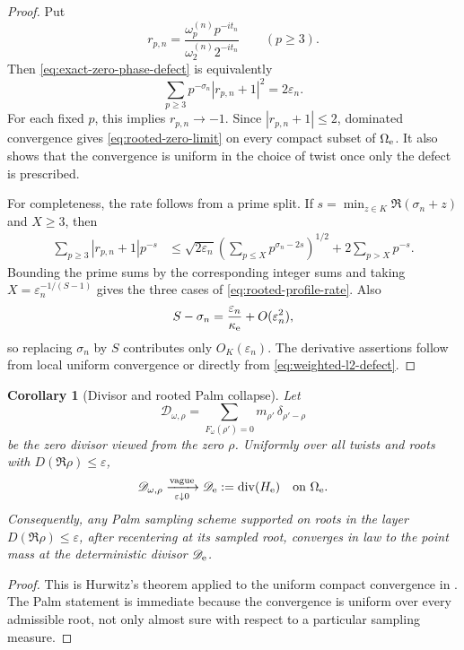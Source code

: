 \documentclass[11pt]{article}
\newtheorem{corollary}[theorem]{Corollary}
\theoremstyle{definition}
\theoremstyle{remark}
\newcommand{\eps}{\varepsilon}
\begin{document}
\begin{proof}
Put
\[
 r_{p,n}=\frac{\omega^{(n)}_p p^{-it_n}}
                 {\omega^{(n)}_2 2^{-it_n}}
 \qquad(p\ge3).
\]
Then \eqref{eq:exact-zero-phase-defect} is equivalently
\begin{equation}
 \sum_{p\ge3}p^{-\sigma_n}|r_{p,n}+1|^2=2\eps_n.
 \label{eq:weighted-l2-defect}
\end{equation}
For each fixed $p$, this implies $r_{p,n}\to-1$.  Since
$|r_{p,n}+1|\le2$, dominated convergence gives
\eqref{eq:rooted-zero-limit} on every compact subset of
$\Omega_{\rm e}$.  It also shows that the convergence is uniform in the
choice of twist once only the defect is prescribed.

For completeness, the rate follows from a prime split.  If
$s=\min_{z\in K}\Re(\sigma_n+z)$ and $X\ge3$, then
\begin{align}
 \sum_{p\ge3}|r_{p,n}+1|p^{-s}
 &\le
 \sqrt{2\eps_n}
 \left(\sum_{p\le X}p^{\sigma_n-2s}\right)^{1/2}
 +2\sum_{p>X}p^{-s}.                         \label{eq:rooted-split}
\end{align}
Bounding the prime sums by the corresponding integer sums and taking
$X=\eps_n^{-1/(S-1)}$ gives the three cases of
\eqref{eq:rooted-profile-rate}.  Also
\[
 S-\sigma_n=\frac{\eps_n}{\kappa_{\rm e}}+O(\eps_n^2),
\]
so replacing $\sigma_n$ by $S$ contributes only $O_K(\eps_n)$.
The derivative assertions follow from local uniform convergence or
directly from \eqref{eq:weighted-l2-defect}.
\end{proof}

\begin{corollary}[Divisor and rooted Palm collapse]
\label{cor:rooted-palm-collapse}
Let
\[
 \mathscr D_{\omega,\rho}
 =\sum_{F_\omega(\rho')=0}m_{\rho'}\,\delta_{\rho'-\rho}
\]
be the zero divisor viewed from the zero $\rho$.  Uniformly over all
twists and roots with $D(\Re\rho)\le\eps$,
\begin{equation}
 \mathscr D_{\omega,\rho}
 \xrightarrow[\eps\downarrow0]{\rm vague}
 \mathscr D_{\rm e}:=\operatorname{div}(H_{\rm e})
 \quad\hbox{on }\Omega_{\rm e}.
 \label{eq:rooted-divisor-collapse}
\end{equation}
Consequently, any Palm sampling scheme supported on roots in the layer
$D(\Re\rho)\le\eps$, after recentering at its sampled root, converges in
law to the point mass at the deterministic divisor $\mathscr D_{\rm e}$.
\end{corollary}

\begin{proof}
This is Hurwitz's theorem applied to the uniform compact convergence in
.  The Palm statement is immediate
because the convergence is uniform over every admissible root, not only
almost sure with respect to a particular sampling measure.
\end{proof}
\end{document}
